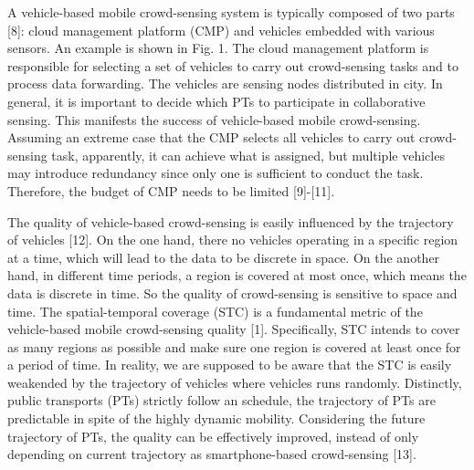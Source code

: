 \documentclass[journal]{IEEEtran}
\begin{document}
A vehicle-based mobile crowd-sensing system is typically composed of two parts [8]: cloud management platform (CMP) and vehicles embedded with various sensors. An example is shown in Fig. 1. The cloud management platform is responsible for selecting a set of vehicles to carry out crowd-sensing tasks and to process data forwarding. The vehicles are sensing nodes distributed in city. In general, it is important to decide which PTs to participate in collaborative sensing. This manifests the success of vehicle-based mobile crowd-sensing. Assuming an extreme case that the CMP selects all vehicles to carry out crowd-sensing task, apparently, it can achieve what is assigned, but multiple vehicles may introduce redundancy since only one is sufficient to conduct the task. Therefore, the budget of CMP needs to be limited [9]-[11].

The quality of vehicle-based crowd-sensing is easily influenced by the trajectory of vehicles [12]. On the one hand, there  no vehicles operating in a specific region at a time, which will lead to the data to be discrete in space. On the another hand, in different time periods, a region is covered at most once, which means the data is discrete in time. So the quality of crowd-sensing is sensitive to space and time. The spatial-temporal coverage (STC) is a fundamental metric of the vehicle-based mobile crowd-sensing quality [1]. Specifically, STC intends to cover as many regions as possible and make sure one region is covered at least once for a period of time. In reality, we are supposed to be aware that the STC is easily weakended by the trajectory of vehicles where vehicles runs randomly. Distinctly, public transports (PTs) strictly follow an schedule, the trajectory of PTs are predictable in spite of the highly dynamic mobility. Considering the future trajectory of PTs, the quality can be effectively improved, instead of only depending on current trajectory as smartphone-based crowd-sensing [13].
\end{document}
